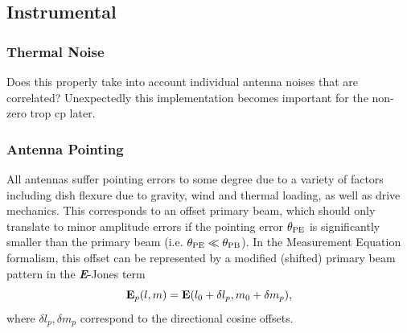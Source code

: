 \subsection{Instrumental}

\subsubsection{Thermal Noise}

Does this properly take into account individual antenna noises that are correlated? Unexpectedly this implementation becomes important for the non-zero trop cp later.

\subsubsection{Antenna Pointing}
All antennas suffer pointing errors to some degree due to a variety of factors including dish flexure due to gravity, wind and thermal loading, as well as drive mechanics. This corresponds to an offset primary beam, which should only translate to minor amplitude errors if the pointing error $\theta_{\rm PE}$ is significantly smaller than the primary beam (i.e. $\theta_{\rm PE} \ll \theta_{\rm PB}$). In the Measurement Equation formalism, this offset can be represented by a modified (shifted) primary beam pattern in the {\bf \it E}-Jones term 
\begin{equation}
{\bf E}_p(l,m) = {\bf E}(l_0 + \delta l_p, m_0 + \delta m_p),
\end{equation}
where $\delta l_p, \delta m_p$ correspond to the directional cosine offsets.



